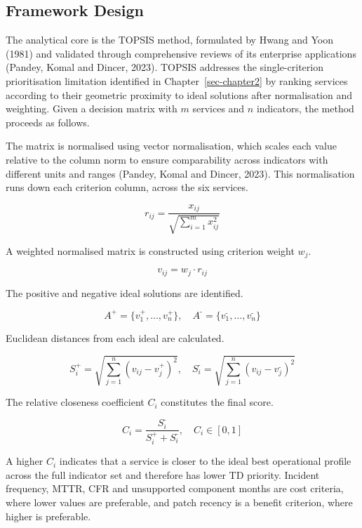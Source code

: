 \documentclass[
  12pt,
  letterpaper,
  12pt,
  oneside,
  english,
  onehalfspacing,
  headsepline]{MastersDoctoralThesis}
\begin{document}
\subsection{Framework Design}\label{sec-frameworkdesign}

The analytical core is the TOPSIS method, formulated by Hwang and Yoon
(1981) and validated through comprehensive reviews of its enterprise
applications (Pandey, Komal and Dincer, 2023). TOPSIS addresses the
single-criterion prioritisation limitation identified in
Chapter~\ref{sec-chapter2} by ranking services according to their
geometric proximity to ideal solutions after normalisation and
weighting. Given a decision matrix with \(m\) services and \(n\)
indicators, the method proceeds as follows.

The matrix is normalised using vector normalisation, which scales each
value relative to the column norm to ensure comparability across
indicators with different units and ranges (Pandey, Komal and Dincer,
2023). This normalisation runs down each criterion column, across the
six services.

\[
r_{ij} = \frac{x_{ij}}{\sqrt{\sum_{i=1}^{m} x_{ij}^2}}
\]

A weighted normalised matrix is constructed using criterion weight
\(w_j\).

\[
v_{ij} = w_j \cdot r_{ij}
\]

The positive and negative ideal solutions are identified.

\[
A^{\text{+}} = \{ v_1^{\text{+}}, \ldots, v_n^{\text{+}} \}, \quad A^{\text{-}} = \{ v_1^{\text{-}}, \ldots, v_n^{\text{-}} \}
\]

Euclidean distances from each ideal are calculated.

\[
S_i^{\text{+}} = \sqrt{\sum_{j=1}^{n}(v_{ij} - v_j^{\text{+}})^2}, \quad
S_i^{\text{-}} = \sqrt{\sum_{j=1}^{n}(v_{ij} - v_j^{\text{-}})^2}
\]

The relative closeness coefficient \(C_i\) constitutes the final score.

\[
C_i = \frac{S_i^{\text{-}}}{S_i^{\text{+}} + S_i^{\text{-}}}, \quad C_i \in [0, 1]
\]

A higher \(C_i\) indicates that a service is closer to the ideal best
operational profile across the full indicator set and therefore has
lower TD priority. Incident frequency, MTTR, CFR and unsupported
component months are cost criteria, where lower values are preferable,
and patch recency is a benefit criterion, where higher is preferable.
\end{document}
